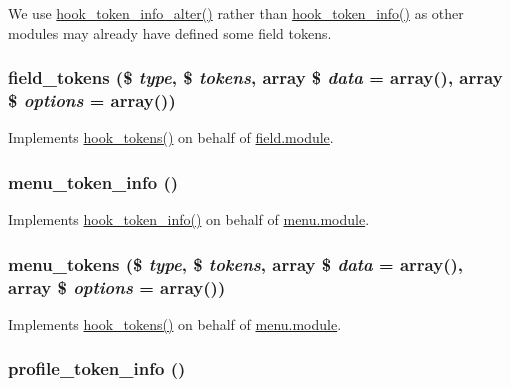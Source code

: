 We use \hyperlink{group__hooks_ga87392434688c9f52c4066de4ab9d73a8}{hook\_\-token\_\-info\_\-alter()} rather than \hyperlink{group__hooks_gab868597197cf36911f95dcd29ae0b954}{hook\_\-token\_\-info()} as other modules may already have defined some field tokens. \hypertarget{token_8tokens_8inc_a2db53cfa66a34afc752a40a00c03d9ca}{
\subsubsection[{field\_\-tokens}]{\setlength{\rightskip}{0pt plus 5cm}field\_\-tokens (\$ {\em type}, \/  \$ {\em tokens}, \/  array \$ {\em data} = {\ttfamily array()}, \/  array \$ {\em options} = {\ttfamily array()})}}
\label{token_8tokens_8inc_a2db53cfa66a34afc752a40a00c03d9ca}
Implements \hyperlink{group__hooks_ga3bfd87d9a19b2397b0f970e1cff7ea4f}{hook\_\-tokens()} on behalf of \hyperlink{field_8module}{field.module}. \hypertarget{token_8tokens_8inc_a285b335dc2753c36919b35c473a08cdd}{
\subsubsection[{menu\_\-token\_\-info}]{\setlength{\rightskip}{0pt plus 5cm}menu\_\-token\_\-info ()}}
\label{token_8tokens_8inc_a285b335dc2753c36919b35c473a08cdd}
Implements \hyperlink{group__hooks_gab868597197cf36911f95dcd29ae0b954}{hook\_\-token\_\-info()} on behalf of \hyperlink{menu_8module}{menu.module}. \hypertarget{token_8tokens_8inc_a34b9f49bd301ee8ffcba2620ec02b154}{
\subsubsection[{menu\_\-tokens}]{\setlength{\rightskip}{0pt plus 5cm}menu\_\-tokens (\$ {\em type}, \/  \$ {\em tokens}, \/  array \$ {\em data} = {\ttfamily array()}, \/  array \$ {\em options} = {\ttfamily array()})}}
\label{token_8tokens_8inc_a34b9f49bd301ee8ffcba2620ec02b154}
Implements \hyperlink{group__hooks_ga3bfd87d9a19b2397b0f970e1cff7ea4f}{hook\_\-tokens()} on behalf of \hyperlink{menu_8module}{menu.module}. \hypertarget{token_8tokens_8inc_ab97ba048343fb5e851742c14a5094dff}{
\subsubsection[{profile\_\-token\_\-info}]{\setlength{\rightskip}{0pt plus 5cm}profile\_\-token\_\-info ()}}
